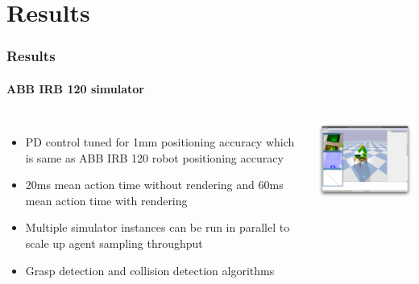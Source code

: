 \documentclass{beamer}
\begin{document}
	\section{Results}
	\begin{frame}
		\frametitle{Results}
		\framesubtitle{ABB IRB 120 simulator}
		
		\begin{columns}[c]
			\begin{itemize}
				\item PD control tuned for 1mm positioning accuracy which is same as ABB IRB 120 robot positioning accuracy
				\item 20ms mean action time without rendering and 60ms mean action time with rendering
				\item Multiple simulator instances can be run in parallel to scale up agent sampling throughput
				\item Grasp detection and collision detection algorithms
			\end{itemize}
			
			\includegraphics[width=6cm]{simulator.png}
		\end{columns}
	\end{frame}
\end{document}
